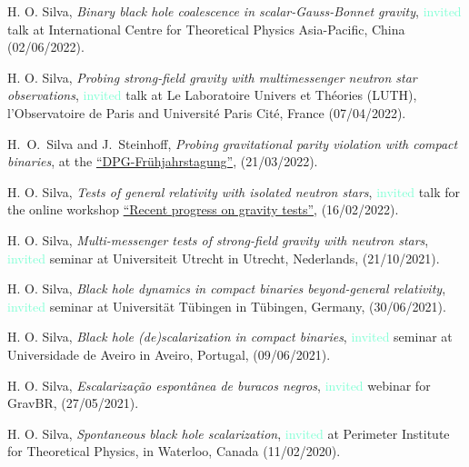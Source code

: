 \documentclass[10pt]{article}
\begin{document}
\begin{bibenum}
    \item H. O. Silva,
    \emph{Binary black hole coalescence in scalar-Gauss-Bonnet gravity},
    \textcolor{Aquamarine}{invited} talk at International Centre for Theoretical Physics Asia-Pacific,
    China
    (02/06/2022).

    \item H. O. Silva,
    \emph{Probing strong-field gravity with multimessenger neutron star observations},
    \textcolor{Aquamarine}{invited} talk at Le Laboratoire Univers et Th\'eories (LUTH), l'Observatoire de Paris and Universit\'e Paris Cit\'e,
    France
    (07/04/2022).

    \item H.~O.~Silva and J.~Steinhoff,
    \emph{Probing gravitational parity violation with compact binaries},
    at the \href{https://heidelberg22.dpg-tagungen.de/}{``DPG-Fr\"uhjahrstagung''},
    (21/03/2022).

    \item H. O. Silva,
    \emph{Tests of general relativity with isolated neutron stars},
    \textcolor{Aquamarine}{invited} talk for the online workshop \href{https://honghui-liu.github.io/gravity-test/}{``Recent progress on gravity tests''},
    (16/02/2022).

    \item H. O. Silva,
    \emph{Multi-messenger tests of strong-field gravity
    with neutron stars},
    \textcolor{Aquamarine}{invited} seminar at Universiteit Utrecht in Utrecht, Nederlands,
    (21/10/2021).

    \item H. O. Silva,
    \emph{Black hole dynamics in compact binaries beyond-general relativity},
    \textcolor{Aquamarine}{invited} seminar at Universit\"at T\"ubingen in T\"ubingen, Germany,
    (30/06/2021).

    \item H. O. Silva,
    \emph{Black hole (de)scalarization in compact binaries},
    \textcolor{Aquamarine}{invited} seminar at Universidade de Aveiro in Aveiro, Portugal,
    (09/06/2021).

    \item H. O. Silva,
    \emph{Escalariza{\c c}{\~a}o espont{\^a}nea de buracos negros},
    \textcolor{Aquamarine}{invited} webinar for GravBR,
    (27/05/2021).

    \item H. O. Silva,
    \emph{Spontaneous black hole scalarization},
    \textcolor{Aquamarine}{invited} at Perimeter Institute for Theoretical Physics,
    in Waterloo, Canada (11/02/2020).


\end{bibenum}
\end{document}
